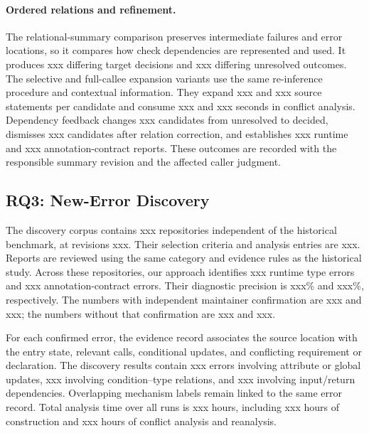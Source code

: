 \paragraph{Ordered relations and refinement.}
The relational-summary comparison preserves intermediate failures and
error locations, so it compares how check dependencies are represented
and used. It produces xxx differing target decisions and xxx differing
unresolved outcomes. The selective and full-callee expansion variants use
the same re-inference procedure and contextual information. They expand
xxx and xxx source statements per candidate and consume xxx and xxx
seconds in conflict analysis. Dependency feedback changes xxx candidates
from unresolved to decided, dismisses xxx candidates after relation
correction, and establishes xxx runtime and xxx annotation-contract
reports. These outcomes are recorded with the responsible summary revision
and the affected caller judgment.

\subsection{RQ3: New-Error Discovery}
\label{sec:rq3}
The discovery corpus contains xxx repositories independent of the
historical benchmark, at revisions xxx. Their selection criteria and
analysis entries are xxx. Reports are reviewed using the same category
and evidence rules as the historical study. Across these repositories,
our approach identifies xxx runtime type errors and xxx
annotation-contract errors. Their diagnostic precision is xxx\% and
xxx\%, respectively. The numbers with independent maintainer confirmation
are xxx and xxx; the numbers without that confirmation are xxx and xxx.

For each confirmed error, the evidence record associates the source
location with the entry state, relevant calls, conditional updates, and
conflicting requirement or declaration. The discovery results contain
xxx errors involving attribute or global updates, xxx involving
condition--type relations, and xxx involving input/return dependencies.
Overlapping mechanism labels remain linked to the same error record.
Total analysis time over all runs is xxx hours, including xxx hours
of construction and xxx hours of conflict analysis and reanalysis.
